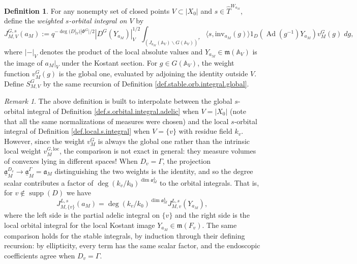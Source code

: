 \documentclass[openany]{amsbook}
\theoremstyle{definition}
\newtheorem{definition}[theorem]{Definition}
\theoremstyle{remark}
\newtheorem{remark}[theorem]{Remark}
\numberwithin{equation}{section}
\newcommand{\A}{\mathbb{A}}
\newcommand{\ul}[1]{\underline{#1}}
\renewcommand{\-}{\operatorname{-}}
\renewcommand{\a}{\mathfrak{a}}
\newcommand{\on}[1]{\operatorname{#1}}
\renewcommand{\A}{\mathbb{A}}
\newcommand{\fm}{\mathfrak{m}}
\renewcommand{\fm}{\mathfrak{m}}
\newcommand{\Ad}{\on{Ad}}
\newcommand{\inv}{\mathrm{inv}}
\newcommand{\ga}{\ul{\a}}
\newcommand{\loc}{\mathrm{loc}}
\begin{document}
\begin{definition}\label{def.s.integral.V}
For any nonempty set of closed points $V \subset |X_0|$ and $s \in \widehat{T}^{W_{a_M}}$, define the \emph{weighted $s$-orbital integral on $V$} by
$$
    J_{M,V}^{G,s}(a_M) := q^{-\deg(D|_V) |\Phi^G|/2} |D^G(Y_{a_M})|_V^{1/2} \int_{(J_{a_M}(\A_V) \backslash G(\A_V))^{\tau}} \langle s, \inv_{a_M}(g) \rangle 1_D(\Ad(g^{-1}) Y_{a_M}) v_M^G(g) \; dg,
$$
where $|-|_V$ denotes the product of the local absolute values and $Y_{a_M} \in \fm(\A_V)$ is the image of $a_M|_V$ under the Kostant section. For $g \in G(\A_V)$, the weight function $v_M^G(g)$ is the global one, evaluated by adjoining the identity outside $V$. Define $S_{M,V}^{G}$ by the same recursion of Definition \ref{def.stable.orb.integral.global}.
\end{definition}

\begin{remark}\label{rmk.partial.local.comparison.J}
    The above definition is built to interpolate between the global $s$-orbital integral of Definition \ref{def.s.orbital.integral.adelic} when $V = |X_0|$ (note that all the same normalizations of measures were chosen) and the local $s$-orbital integral of Definition \ref{def.local.s.integral} when $V = \{v\}$ with residue field $k_v$. However, since the weight $v_M^G$ is always the global one rather than the intrinsic local weight $v_M^{G, \loc}$, the comparison is not exact in general: they measure volumes of convexes lying in different spaces! When $D_v = \Gamma$, the projection $\ga_M^{D_v} \to \ga_M^\Gamma = \a_M$ distinguishing the two weights is the identity, and so the degree scalar contributes a factor of $\deg(k_v/k_0)^{\dim \a^L_M}$ to the orbital integrals. That is, for $v \not\in \on{supp}(D)$ we have
    $$
        J^{L,s}_{M, \{v\}}(a_M) = \deg(k_v/k_0)^{\dim \a_M^L} J_{M,v}^{L,s}(Y_{a_M}),
    $$
    where the left side is the partial adelic integral on $\{v\}$ and the right side is the local orbital integral for the local Kostant image $Y_{a_M} \in \fm(F_v)$. The same comparison holds for the stable integrals, by induction through their defining recursion: by ellipticity, every term has the same scalar factor, and the endoscopic coefficients agree when $D_v = \Gamma$.
\end{remark}
\end{document}
